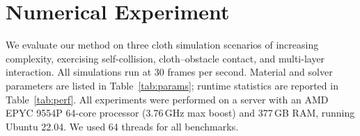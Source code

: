 \documentclass[acmtog,anonymous,review]{acmart}
\begin{document}
%
%
%
%
\section{Numerical Experiment}

We evaluate our method on three cloth simulation scenarios of
increasing complexity, exercising self-collision, cloth--obstacle
contact, and multi-layer interaction. All simulations run at 30
frames per second. Material and solver parameters are listed in
Table~\ref{tab:params}; runtime statistics are reported in
Table~\ref{tab:perf}. All experiments were performed on a server
with an AMD EPYC 9554P 64-core processor (3.76\,GHz max boost) and
377\,GB RAM, running Ubuntu 22.04. We used 64 threads for all
benchmarks.
\end{document}
